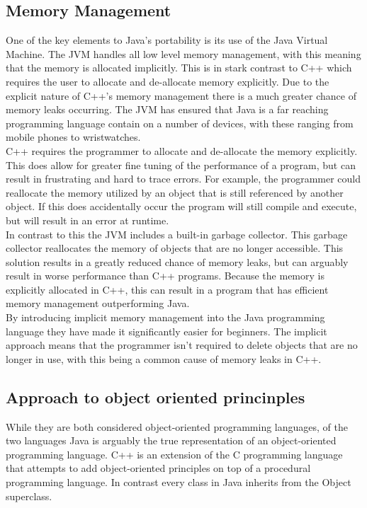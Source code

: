 \documentclass[11pt]{article}  %
\theoremstyle{definition}
\theoremstyle{remark}
\begin{document}
\subsection{Memory Management}\label{ss:back}

One of the key elements to Java's portability is its use of the Java Virtual Machine. The JVM handles all low level memory management, with this meaning that the memory is allocated implicitly. This is in stark contrast to C++ which requires the user to allocate and de-allocate memory explicitly. Due to the explicit nature of C++'s memory management there is a much greater chance of memory leaks occurring. The JVM has ensured that Java is a far reaching programming language contain on a number of devices, with these ranging from mobile phones to wristwatches.\\

C++ requires the programmer to allocate and de-allocate the memory explicitly. This does allow for greater fine tuning of the performance of a program, but can result in frustrating and hard to trace errors. For example, the programmer could reallocate the memory utilized by an object that is still referenced by another object.  If this does accidentally occur the program will still compile and execute, but will result in an error at runtime.\\

In contrast to this the JVM includes a built-in garbage collector. This garbage collector reallocates the memory of objects that are no longer accessible. This solution results in a greatly reduced chance of memory leaks, but can arguably result in worse performance than C++ programs. Because the memory is explicitly allocated in C++, this can result in a program that has efficient memory management outperforming Java.\\

By introducing implicit memory management into the Java programming language they have made it significantly easier for beginners. The implicit approach means that the programmer isn’t required to delete objects that are no longer in use, with this being a common cause of memory leaks in C++.\\

\subsection{Approach to object oriented princinples}\label{ss:back}

While they are both considered object-oriented programming languages, of the two languages Java is arguably the true representation of an object-oriented programming language. C++ is an extension of the C programming language that attempts to add object-oriented principles on top of a procedural programming language. In contrast every class in Java inherits from the Object superclass.\\
\end{document}
